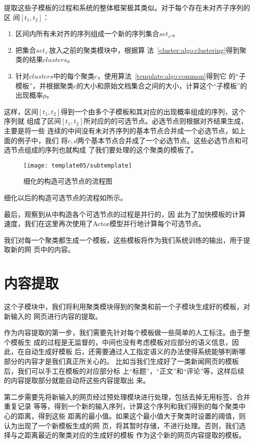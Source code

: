 提取这些子模板的过程和系统的整体框架极其类似。对于每个存在未对齐子序列的区
间$[t_1,t_2]$：
\begin{enumerate}
\item 区间内所有未对齐的序列组成一个新的序列集合$set_{s'}$。
\item 把集合$set_{s'}$放入之前的聚类模块中，根据算
  法~\ref{cluster:algo:clustering}得到聚类的结果$clusters$。
\item 针对$clusters$中的每个聚类$c$，使用算法~\ref{template:algo:common}得到它
  的“子模板”，并根据聚类$c$的大小和原始文档集合之间的大小，计算这个“子模板”的
  出现概率$p$。
\end{enumerate}

这样，区间$[t_1,t_2]$得到一个由多个子模板和其对应的出现概率组成的序列，这个序列就
组成了区间$[t_1,t_2]$所对应的的可选节点。必选节点则根据对齐结果生成，主要是将一些
连续的中间没有未对齐序列的基本节点合并成一个必选节点，如上面的例子中，我们
将$c,d$两个基本节点合并成了一个必选节点。这些必选节点和可选节点组成的序列也就构成
了我们要处理的这个聚类的模板了。
\begin{figure}
  \centering
  \texttt{[image: template05/subtemplate]}
  \caption{细化的构造可选节点的流程图}
  \label{template:fig:subtemplate}
\end{figure}

细化以后的构造可选节点的流程如所示。

最后，观察到从中构造各个可选节点的过程是并行的，因
此为了加快模板的计算速度，我们在这里再次使用了Actor模型并行地计算每个可选节点。

我们对每一个聚类都生成一个模板，这些模板将作为我们系统训练的输出，用于提取新的网
页中的内容。
\section{内容提取}
\label{sec:extraction}
这个子模块中，我们将利用聚类模块得到的聚类和前一个子模块生成好的模板，对新输入的
网页进行内容的提取。

作为内容提取的第一步，我们需要先针对每个模板做一些简单的人工标注。由于整个模板生
成的过程是无监督的，中间也没有考虑模板对应部分的语义信息，因此，在自动生成好模板
后，还需要通过人工指定语义的办法使得系统能够判断哪部分的内容才是我们真正所关心的。
比如当我们生成好了一类新闻网页的模板后，我们可以手工在模板的对应部分标
上“标题”，“正文”和“评论”等，这样后续的内容提取部分就能自动将这些内容提取出
来。

第二步需要先将新输入的网页经过预处理模块进行处理，包括去掉无用标签、合并重复记录
等等，得到一个新的输入序列，计算这个序列和我们得到的每个聚类中心的距离，得到这些
距离的最小值。如果这个最小值大于聚类时设置的阈值，则认为出现了一个新模板生成的网
页，将其暂时存储，不进行处理。否则，我们选择与之距离最近的聚类对应的生成好的模板
作为这个新的网页内容提取的模板。

